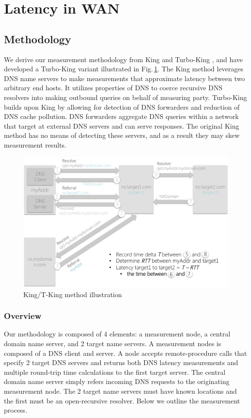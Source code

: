 \section{Latency in WAN}
\label{sec:latency-wan}

\subsection{Methodology}
\label{sec:methodology}

We derive our measurement methodology from King \cite{gummadi2002king} and Turbo-King \cite{leonard2008turbo}, and have developed a Turbo-King variant illustrated in Fig.\,\ref{fig:king_model}. The King method leverages DNS name servers to make measurements that approximate latency between two arbitrary end hosts. It utilizes properties of DNS to coerce recursive DNS resolvers into making outbound queries on behalf of measuring party. Turbo-King builds upon King by allowing for detection of DNS forwarders and reduction of DNS cache pollution. DNS forwarders aggregate DNS queries within a network that target at external DNS servers and can serve responses. The original King method has no means of detecting these servers, and as a result they may skew measurement results.

\begin{figure}
  \centering
  \includegraphics[width=\linewidth]{../figs/king_model.pdf}
  \vspace{-1em}
  \caption{King/T-King method illustration}
  \label{fig:king_model}
\end{figure}

\subsubsection{Overview}
Our methodology is composed of 4 elements: a measurement node, a central domain name server, and 2 target name servers. A measurement nodes is composed of a DNS client and server. A node accepts remote-procedure calls that specify 2 target DNS servers and returns both DNS latency measurements and multiple round-trip time calculations to the first target server. The central domain name server simply refers incoming DNS requests to the originating measurement node. The 2 target name servers must have known locations and the first must be an open-recursive resolver. Below we outline the measurement process.

